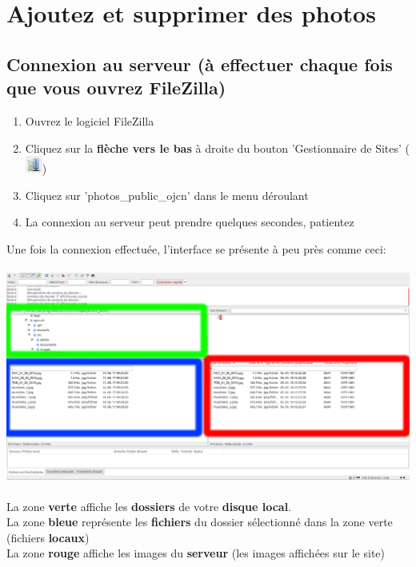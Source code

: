 \documentclass[10pt,a4paper]{article}
\begin{document}
\section{Ajoutez et supprimer des photos}
\subsection{Connexion au serveur (à effectuer chaque fois que vous ouvrez FileZilla)}
\begin{enumerate}
\item Ouvrez le logiciel FileZilla
\item Cliquez sur la \textbf{flèche vers le bas} à droite du bouton 'Gestionnaire de Sites' (\includegraphics[scale=1]{images/gestionnaire_de_sites.png})
\item Cliquez sur 'photos\_public\_ojcn' dans le menu déroulant
\item La connexion au serveur peut prendre quelques secondes, patientez
\end{enumerate}
\newpage

Une fois la connexion effectuée, l'interface se présente à peu près comme ceci: \\ 
\\
\includegraphics[scale=.2]{images/connected_modif.png} \\
\\
La zone \textbf{verte} affiche les \textbf{dossiers} de votre \textbf{disque local}.\\
La zone \textbf{bleue} représente les \textbf{fichiers} du dossier sélectionné dans la zone verte (fichiers \textbf{locaux}) \\
La zone \textbf{rouge} affiche les images du \textbf{serveur} (les images affichées sur le site) \\
\end{document}
